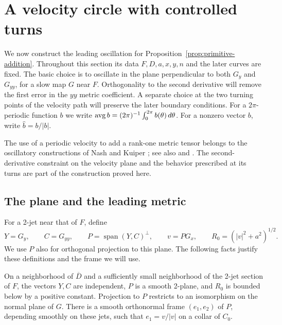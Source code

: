 \section{A velocity circle with controlled turns}
\label{sec:velocity-loop}

We now construct the leading oscillation for
Proposition~\ref{prop:primitive-addition}.  Throughout this section its data
$F,D,a,x,y,n$ and the later curves are fixed.  The basic choice is to
oscillate in the plane perpendicular to both $G_y$ and $G_{yy}$, for a
slow map $G$ near $F$.  Orthogonality to the second derivative will remove
the first error in the $yy$ metric coefficient.  A separate choice at the
two turning points of the velocity path will preserve the later boundary
conditions.  For a $2\pi$-periodic function $b$ we write
$\operatorname{avg} b=(2\pi)^{-1}\int_0^{2\pi}b(\theta)\,d\theta$.
For a nonzero vector $b$, write $\widehat b=b/|b|$.

The use of a periodic velocity to add a rank-one metric tensor belongs
to the oscillatory constructions of Nash and Kuiper
\cite{Nash1954,Kuiper1955}; see also \cite[\S4]{Choquet1958} and
\cite[\S\S3.2--3.3]{Gromov2015}.
The second-derivative constraint on the velocity plane and the behavior
prescribed at its turns are part of the construction proved here.

\subsection{The plane and the leading metric}

For a 2-jet near that of $F$, define
\begin{equation}
 Y=G_y,\qquad C=G_{yy},\qquad
 P=\operatorname{span}(Y,C)^\perp,\qquad
 v=PG_x,\qquad R_0=(|v|^2+a^2)^{1/2}.
 \label{eq:velocity-plane}
\end{equation}
We use $P$ also for orthogonal projection to this plane.  The following
facts justify these definitions and the frame we will use.

\begin{lemma}
\label{lem:velocity-plane}
On a neighborhood of $\overline D$ and a sufficiently small neighborhood
of the 2-jet section of $F$, the vectors $Y,C$ are independent, $P$ is a
smooth 2-plane, and $R_0$ is bounded below by a positive constant.
Projection to $P$ restricts to an isomorphism on the normal plane of $G$.
There is a smooth orthonormal frame $(e_1,e_2)$ of $P$, depending smoothly
on these jets, such that $e_1=v/|v|$ on a collar of $C_0$.
\end{lemma}

